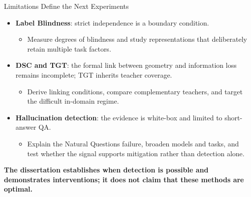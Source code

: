 \documentclass[aspectratio=1610]{beamer}
\begin{document}
\begin{frame}{Limitations Define the Next Experiments}
\begin{itemize}
  \item \textbf{Label Blindness}: strict independence is a boundary condition.
  \begin{itemize}
    \item Measure degrees of blindness and study representations that deliberately retain multiple task factors.
  \end{itemize}
  \item \textbf{DSC and TGT}: the formal link between geometry and information loss remains incomplete; TGT inherits teacher coverage.
  \begin{itemize}
    \item Derive linking conditions, compare complementary teachers, and target the difficult in-domain regime.
  \end{itemize}
  \item \textbf{Hallucination detection}: the evidence is white-box and limited to short-answer QA.
  \begin{itemize}
    \item Explain the Natural Questions failure, broaden models and tasks, and test whether the signal supports mitigation rather than detection alone.
  \end{itemize}
\end{itemize}

\vfill
\begin{center}
  \textbf{The dissertation establishes when detection is possible and demonstrates interventions; it does not claim that these methods are optimal.}
\end{center}
\end{frame}
\end{document}
